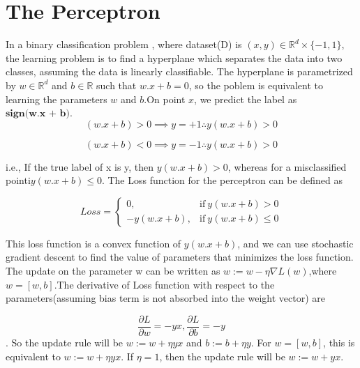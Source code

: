 \documentclass[12pt]{article}
\begin{document}
\section{The Perceptron}
In a binary classification problem , where dataset(D) is  $(x,y) \in \mathbb{R}^{d} \times\{-1,1\}$, the  learning problem is to find a hyperplane which separates the data into two classes, 
 assuming the data is linearly classifiable. The hyperplane is parametrized by $w\in\mathbb{R}^{d}$ and $ b \in \mathbb{R}$ such that $w.x + b = 0 $, so the poblem is equivalent to learning  the parameters $w$ and $b$.On point $x$, we predict the label as $\textbf{sign(w.x + b)}$.\\
$$(w.x + b) > 0  \implies y = +1 \therefore y(w.x + b) > 0 $$

$$(w.x + b) < 0  \implies y = -1 \therefore y(w.x + b) > 0 $$
 
i.e., If the true label of x is y, then $y(w.x + b) > 0 $, whereas for a misclassified pointi$y(w.x + b) \leq 0 $. The Loss function  for the perceptron can be defined as 





\begin{equation} 
Loss=
\begin{cases}
0, & \text{if} \ y(w.x + b) > 0 
 \\
-y(w.x + b) , & \text{if} \ y(w.x + b) \leq 0 
\end{cases}
\end{equation}

This loss function is a convex function of $y(w.x + b)$, and we can use stochastic gradient descent to find the value of  parameters that minimizes the loss function.
The update on the parameter w can be written as $w := w - \eta \nabla L(w)$,where $w = [w,b]$.The derivative of Loss function with respect to the parameters(assuming bias term is not absorbed into the weight vector) are 

$$\frac{\partial L}{\partial w} = -yx , \frac{\partial L}{\partial b} = -y$$.
 \cleardoublepage
So the update rule will be $w := w + \eta yx $ and $b := b + \eta y$. For $w = [w,b]$, this is equivalent  to  $w := w + \eta yx $.
If $\eta = 1$, then the update rule will be  $w := w +  yx $.
\end{document}
